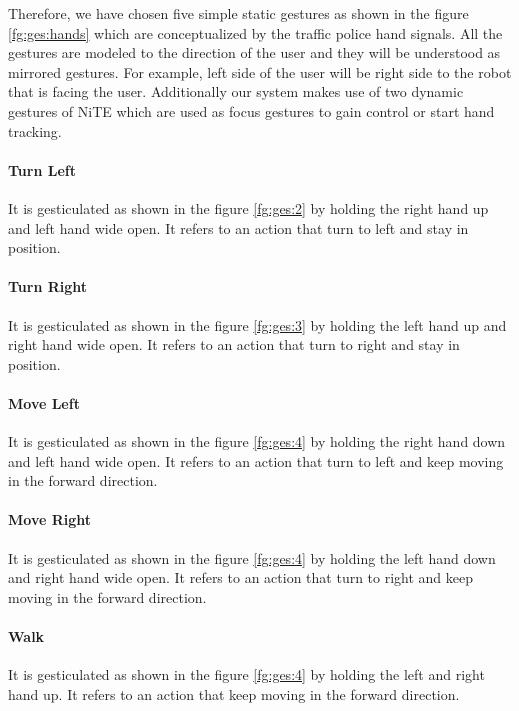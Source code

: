 

Therefore, we have chosen five simple static gestures as shown in the figure \ref{fg:ges:hands} which are conceptualized by the traffic police hand signals. All the gestures are modeled to the direction of the user and they will be understood as mirrored gestures. For example, left side of the user will be right side to the robot that is facing the user. Additionally our system makes use of two dynamic gestures of NiTE which are used as focus gestures to gain control or start hand tracking.

\paragraph*{Turn Left} It is gesticulated as shown in the figure \ref{fg:ges:2} by holding the right hand up and left hand wide open. It refers to an action that turn to left and stay in position. 

\paragraph*{Turn Right} It is gesticulated as shown in the figure \ref{fg:ges:3} by holding the left hand up and right hand wide open. It refers to an action that turn to right and stay in position. 

\paragraph*{Move Left} It is gesticulated as shown in the figure \ref{fg:ges:4} by holding the right hand down and left hand wide open. It refers to an action that turn to left and keep moving in the forward direction.

\paragraph*{Move Right} It is gesticulated as shown in the figure \ref{fg:ges:4} by holding the left hand down and right hand wide open. It refers to an action that turn to right and keep moving in the forward direction.

\paragraph*{Walk} It is gesticulated as shown in the figure \ref{fg:ges:4} by holding the left and right hand up. It refers to an action that keep moving in the forward direction.

